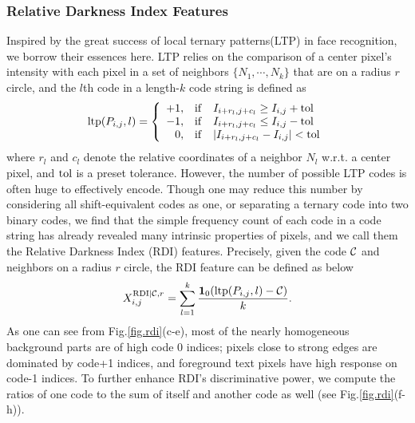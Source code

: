 \documentclass[onecolumn,11pt,draftcls,journal]{IEEEtran}
\newcommand{\im}[1]{{\bf{#1}}}
\begin{document}
\subsubsection{Relative Darkness Index Features}
Inspired by the great success of local ternary patterns(LTP) \cite{LTP2010} in face recognition, we borrow their essences here. LTP relies on the comparison of a center pixel's intensity with each pixel in a set of neighbors $\{N_1, \cdots, N_k\}$ that are on a radius $r$ circle, and the $l$th code in a length-$k$ code string is defined as
\begin{equation}{\rm{ltp}}( P_{i,j}, l ) = \left\{
\begin{array}{rcl}
+1, &{\rm if}& I_{i +r_l, j+c_l} \geq I_{i,j} + \rm{tol}\\
-1, &{\rm if}& I_{i +r_l, j+c_l} \leq I_{i,j}-\rm{tol}\\
0, &{\rm if }& | I_{i +r_l, j+c_l} - I_{i,j}|<\rm{tol}\\
\end{array}
\right.
\end{equation}
where $r_l$ and $c_l$ denote the relative coordinates of a neighbor $N_l$ w.r.t. a center pixel, and $\rm{tol}$ is a preset tolerance. However, the number of possible LTP codes is often huge to effectively encode. Though one may reduce this number by considering all shift-equivalent codes as one, or separating a ternary code into two binary codes, we find that the simple frequency count of each code in a code string has already revealed many intrinsic properties of pixels, and we call them the Relative Darkness Index (RDI) features. 
Precisely, given the code ${\cal{C}}$ and neighbors on a radius $r$ circle, the RDI feature can be defined as below
\begin{equation}
X_{i,j}^{{\rm{RDI}}| {\cal{C}}, r } = \sum_{l=1}^{k}{{\im{1}}_{0}({\rm{ltp}}(P_{i,j}, l)-{{\cal{C}}})\over k}.
\label{fig.rdi}
\end{equation}
As one can see from Fig.\ref{fig.rdi}(c-e), most of the nearly homogeneous background parts are of high code 0 indices; pixels close to strong edges are dominated by code+1 indices, and foreground text pixels have high response on code-1 indices. To further enhance RDI's discriminative power, we compute the ratios of one code to the sum of itself and another code as well (see Fig.\ref{fig.rdi}(f-h)).
\end{document}
